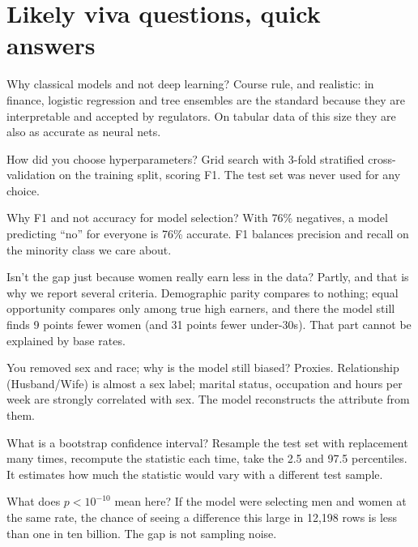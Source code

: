 \documentclass[11pt,a4paper]{article}
\begin{document}
\section{Likely viva questions, quick answers}\label{sec:questions}

\begin{qa}{Why classical models and not deep learning?}
Course rule, and realistic: in finance, logistic regression and tree ensembles are the standard because they are interpretable and accepted by regulators. On tabular data of this size they are also as accurate as neural nets.
\end{qa}
\begin{qa}{How did you choose hyperparameters?}
Grid search with 3-fold stratified cross-validation on the training split, scoring F1. The test set was never used for any choice.
\end{qa}
\begin{qa}{Why F1 and not accuracy for model selection?}
With 76\% negatives, a model predicting ``no'' for everyone is 76\% accurate. F1 balances precision and recall on the minority class we care about.
\end{qa}
\begin{qa}{Isn't the gap just because women really earn less in the data?}
Partly, and that is why we report several criteria. Demographic parity compares to nothing; equal opportunity compares only among true high earners, and there the model still finds 9 points fewer women (and 31 points fewer under-30s). That part cannot be explained by base rates.
\end{qa}
\begin{qa}{You removed sex and race; why is the model still biased?}
Proxies. Relationship (Husband/Wife) is almost a sex label; marital status, occupation and hours per week are strongly correlated with sex. The model reconstructs the attribute from them.
\end{qa}
\begin{qa}{What is a bootstrap confidence interval?}
Resample the test set with replacement many times, recompute the statistic each time, take the 2.5 and 97.5 percentiles. It estimates how much the statistic would vary with a different test sample.
\end{qa}
\begin{qa}{What does $p<10^{-10}$ mean here?}
If the model were selecting men and women at the same rate, the chance of seeing a difference this large in 12,198 rows is less than one in ten billion. The gap is not sampling noise.
\end{qa}
\end{document}
